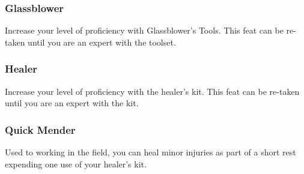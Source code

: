 \subsubsection{Glassblower} \label{feat::glassblower}
    Increase your level of proficiency with Glassblower's Tools.
    This feat can be re-taken until you are an expert with the toolset.

\subsubsection{Healer} \label{feat::healer}
    Increase your level of proficiency with the healer's kit.
    This feat can be re-taken until you are an expert with the kit.
\subsubsection{Quick Mender} \label{feat::quickmender}
    Used to working in the field, you can heal minor injuries as part of a short rest expending one use of your healer's kit.

